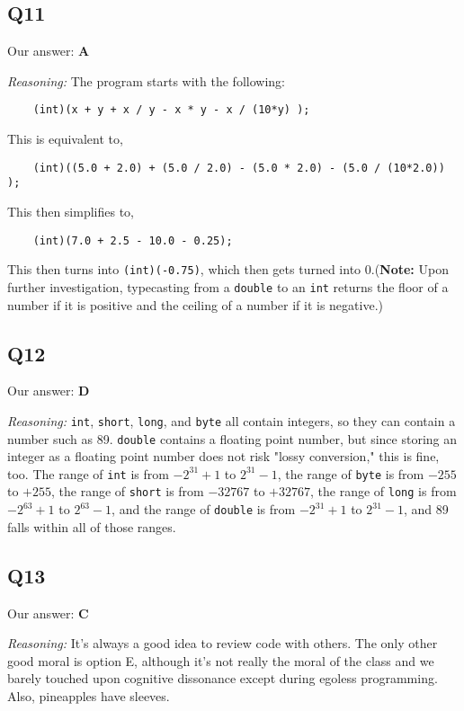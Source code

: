\documentclass{article}
\begin{document}
\subsection{Q11}

Our answer: \textbf{A}

\noindent\textit{Reasoning:} The program starts with the following:
\begin{verbatim}
    (int)(x + y + x / y - x * y - x / (10*y) );
\end{verbatim}
This is equivalent to,
\begin{verbatim}
    (int)((5.0 + 2.0) + (5.0 / 2.0) - (5.0 * 2.0) - (5.0 / (10*2.0)) );
\end{verbatim}
This then simplifies to,
\begin{verbatim}
    (int)(7.0 + 2.5 - 10.0 - 0.25);
\end{verbatim}
This then turns into \verb|(int)(-0.75)|, which then gets turned into 0.(\textbf{Note:} Upon further investigation, typecasting from a \verb|double| to an \verb|int| returns the floor of a number if it is positive and the ceiling of a number if it is negative.)

\subsection{Q12}

Our answer: \textbf{D}

\noindent\textit{Reasoning:} \verb|int|, \verb|short|, \verb|long|, and \verb|byte| all contain integers, so they can contain a number such as 89. \verb|double| contains a floating point number, but since storing an integer as a floating point number does not risk "lossy conversion," this is fine, too. The range of \verb|int| is from \(-2^{31} + 1\) to \(2^{31} - 1\), the range of \verb|byte| is from \(-255\) to \(+255\), the range of \verb|short| is from \(-32767\) to \(+32767\), the range of \verb|long| is from \(-2^{63} + 1\) to \(2^{63} - 1\), and the range of \verb|double| is from \(-2^{31} + 1\) to \(2^{31} - 1\), and 89 falls within all of those ranges.

\subsection{Q13}

Our answer: \textbf{C}

\noindent\textit{Reasoning:} It's always a good idea to review code with others. The only other good moral is option E, although it's not really the moral of the class and we barely touched upon cognitive dissonance except during egoless programming. Also, pineapples have sleeves.
\end{document}

